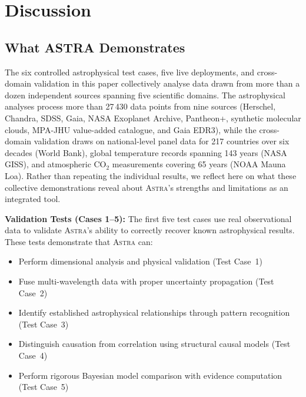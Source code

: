 \documentclass[fleqn,usenatbib]{mnras}
\newcommand{\astra}{\textsc{Astra}\xspace}
\begin{document}
\section{Discussion}
\label{sec:discussion}

\subsection{What ASTRA Demonstrates}
\label{sec:discussion:demonstrates}

The six controlled astrophysical test cases, five live deployments, and cross-domain validation in this paper collectively analyse data drawn from more than a dozen independent sources spanning five scientific domains.
The astrophysical analyses process more than 27\,430 data points from nine sources (Herschel, Chandra, SDSS, Gaia, NASA Exoplanet Archive, Pantheon+, synthetic molecular clouds, MPA-JHU value-added catalogue, and Gaia EDR3), while the cross-domain validation draws on national-level panel data for 217 countries over six decades (World Bank), global temperature records spanning 143 years (NASA GISS), and atmospheric CO$_{2}$ measurements covering 65 years (NOAA Mauna Loa).
Rather than repeating the individual results, we reflect here on what these collective demonstrations reveal about \astra's strengths and limitations as an integrated tool.

\textbf{Validation Tests (Cases 1--5):}
The first five test cases use real observational data to validate \astra's ability to correctly recover known astrophysical results.
These tests demonstrate that \astra can:
\begin{itemize}
  \item Perform dimensional analysis and physical validation (Test Case~1)
  \item Fuse multi-wavelength data with proper uncertainty propagation (Test Case~2)
  \item Identify established astrophysical relationships through pattern recognition (Test Case~3)
  \item Distinguish causation from correlation using structural causal models (Test Case~4)
  \item Perform rigorous Bayesian model comparison with evidence computation (Test Case~5)
\end{itemize}
\end{document}
